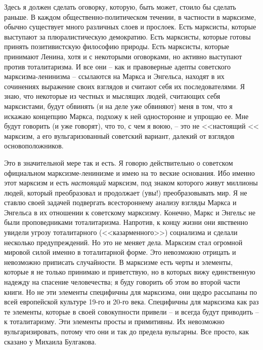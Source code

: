 \documentclass{book}
\begin{document}
Здесь я должен сделать оговорку, которую, быть может, стоило бы сделать раньше. В каждом общественно-политиче­ском течении, в 
частности в марксизме, обычно существует много различных слоев и прослоек. Есть марксисты, которые выступают за плюралистическую 
демократию. Есть марксисты, которые готовы принять позитивистскую философию природы. Есть марксисты, которые принимают Ленина, 
хотя и с некоторыми оговорками, но активно выступают против тоталитаризма. И все они -- как и правоверные адепты советского 
марксизма-ленинизма -- ссылаются на Маркса и Энгельса, находят в их сочинениях выражение своих взглядов и считают себя их 
последователями. Я знаю, что некоторые из честных и мыслящих людей, считающих себя марксистами, будут обвинять (и на деле уже 
обвиняют) меня в том, что я искажаю концеп­цию Маркса, подхожу к ней односторонне и упрощаю ее. Мне будут говорить (и уже 
говорят), что то, с чем я воюю, -- это не <<настоящий << марксизм, а его вульгаризованный советский вариант, далекий от взглядов 
основоположников.

Это в значительной мере так и есть. Я говорю действитель­но о советском официальном марксизме-ленинизме и имею на то веские 
основания. Ибо именно этот марксизм и есть \textit{насто­ящий}  марксизм, под знаком которого живут миллионы людей, который 
преобразовал и продолжает (увы!) преобразовывать мир. Я не ставлю своей задачей подвергать всестороннему ана­лизу взгляды Маркса 
и Энгельса в их отношении к советскому марксизму. Конечно, Маркс и Энгельс не были проповедниками тоталитаризма. Напротив, к 
концу жизни они явственно увиде­ли угрозу тоталитарного (<<казарменного>>) социализма и сдела­ли несколько предупреждений. Но это не 
меняет дела. Марк­сизм стал огромной мировой силой именно в тоталитарной фор­ме. Это невозможно отрицать и невозможно приписать 
случай­ности. В марксизме есть черты и элементы, которые я не толь­ко принимаю и приветствую, но в которых вижу единственную 
надежду на спасение человечества; я буду говорить об этом во второй части книги. Но не эти элементы специфичны  для марксизма, 
они щедро рассыпаны по всей европейской культуре 19-го и 20-го века. Специфичны для марксизма как раз те эле­менты, которые в 
своей совокупности привели -- и всегда будут приводить -- к тоталитаризму. Эти элементы просты и примитивны. Их невозможно 
вульгаризировать, потому что они и так до предела вульгарны. Все просто, как сказано у Михаила Булгакова.
\end{document}

